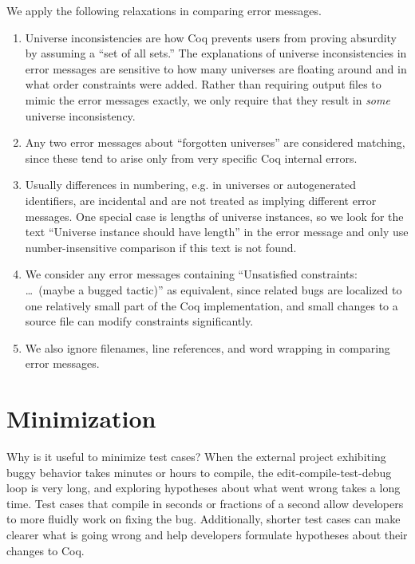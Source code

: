 \documentclass[a4paper,USenglish,cleveref,autoref,thm-restate]{lipics-v2021}
\begin{document}
We apply the following relaxations in comparing error messages.
\begin{enumerate}

\item Universe inconsistencies are how Coq prevents users from proving absurdity by assuming a ``set of all sets.''
The explanations of universe inconsistencies in error messages are sensitive to how many universes are floating around and in what order constraints were added.
Rather than requiring output files to mimic the error messages exactly, we only require that they result in \emph{some} universe inconsistency.

\item Any two error messages about ``forgotten universes'' are considered matching, since these tend to arise only from very specific Coq internal errors.

\item Usually differences in numbering, e.g. in universes or autogenerated identifiers, are incidental and are not treated as implying different error messages.  One special case is lengths of universe instances, so we look for the text ``Universe instance should have length'' in the error message and only use number-insensitive comparison if this text is not found.

\item We consider any error messages containing ``Unsatisfied constraints: \ldots\ (maybe a bugged tactic)'' as equivalent, since related bugs are localized to one relatively small part of the Coq implementation, and small changes to a source file can modify constraints significantly.

\item We also ignore filenames, line references, and word wrapping in comparing error messages.

\end{enumerate}

\section{Minimization}

Why is it useful to minimize test cases?
When the external project exhibiting buggy behavior takes minutes or hours to compile, the edit-compile-test-debug loop is very long, and exploring hypotheses about what went wrong takes a long time.
Test cases that compile in seconds or fractions of a second allow developers to more fluidly work on fixing the bug.
Additionally, shorter test cases can make clearer what is going wrong and help developers formulate hypotheses about their changes to Coq.
\end{document}
